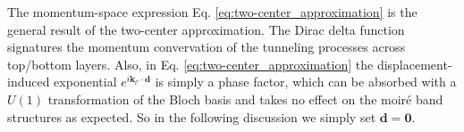 
The momentum-space expression Eq. \eqref{eq:two-center_approximation} is the general result of the two-center approximation. The Dirac delta function signatures the momentum convervation of the tunneling processes across top/bottom layers. Also, in Eq. \eqref{eq:two-center_approximation} the displacement-induced exponential $e^{i\bm k_{l'}\cdot\bm d}$ is simply a phase factor, which can be absorbed with a $U(1)$ transformation of the Bloch basis and takes no effect on the moir\'e band structures as expected. So in the following discussion we simply set $\bm d=\bm 0$.


